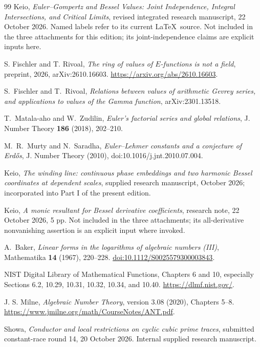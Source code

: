 \documentclass[11pt,a4paper]{article}
\theoremstyle{definition}\newtheorem{definition}[theorem]{Definition}
\theoremstyle{remark}\newtheorem{remark}[theorem]{Remark}
\begin{document}
\begin{thebibliography}{99}
 Keio, \emph{Euler--Gompertz and Bessel Values: Joint
Independence, Integral Intersections, and Critical Limits}, revised
integrated research manuscript, 22 October 2026. Named labels refer to
its current \LaTeX\ source. Not included in the three attachments for this edition; its joint-independence claims are explicit inputs here.

 S. Fischler and T. Rivoal, \emph{The ring of values of
$E$-functions is not a field}, preprint, 2026, arXiv:2610.16603.
\url{https://arxiv.org/abs/2610.16603}.

 S.~Fischler and T.~Rivoal, \emph{Relations between values of
arithmetic Gevrey series, and applications to values of the Gamma function},
arXiv:2301.13518.

 T.~Matala-aho and W.~Zudilin, \emph{Euler's factorial series and
global relations}, J. Number Theory \textbf{186} (2018), 202--210.

 M.~R.~Murty and N.~Saradha, \emph{Euler--Lehmer constants and a
conjecture of Erd\H{o}s}, J. Number Theory (2010),
doi:10.1016/j.jnt.2010.07.004.

 Keio, \emph{The winding line: continuous phase embeddings
and two harmonic Bessel coordinates at dependent scales}, supplied research
manuscript, October 2026; incorporated into Part I of the present edition.

 Keio, \emph{A monic resultant for Bessel derivative
coefficients}, research note, 22 October 2026, 5 pp. Not included in the three attachments; its all-derivative nonvanishing assertion is an explicit input where invoked.

 A.~Baker, \emph{Linear forms in the logarithms of
algebraic numbers (III)}, Mathematika \textbf{14} (1967), 220--228.
\href{https://doi.org/10.1112/S0025579300003843}{doi:10.1112/S0025579300003843}.

 NIST Digital Library of Mathematical Functions,
Chapters 6 and 10, especially Sections 6.2, 10.29, 10.31, 10.32,
10.34, and 10.40. \url{https://dlmf.nist.gov/}.

 J. S. Milne, \emph{Algebraic Number Theory},
version 3.08 (2020), Chapters 5--8.
\url{https://www.jmilne.org/math/CourseNotes/ANT.pdf}.

 Showa, \emph{Conductor and local restrictions on cyclic
cubic prime traces}, submitted constant-race round 14,
20 October 2026. Internal supplied research manuscript.


\end{thebibliography}
\end{document}
